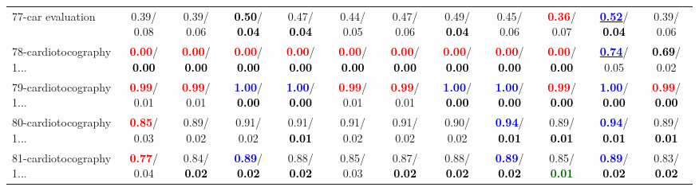 \begin{table}[h]
\begin{center}
{\begin{tabular}{lc|c|c|c|c|c|c|c|c|c|c}
77-car evaluation &   0.39/  0.08 &   0.39/  0.06 & \textcolor{black}{\textbf{  0.50}}/\textcolor{black}{\textbf{  0.04}} &   0.47/\textcolor{black}{\textbf{  0.04}} &   0.44/  0.05 &   0.47/  0.06 &   0.49/\textcolor{black}{\textbf{  0.04}} &   0.45/  0.06 & \textcolor{red}{\textbf{  0.36}}/  0.07 & \underline{\textcolor{blue}{\textbf{  0.52}}}/\textcolor{black}{\textbf{  0.04}} &   0.39/  0.06 \\
78-cardiotocography 1... & \textcolor{red}{\textbf{  0.00}}/\textcolor{black}{\textbf{  0.00}} & \textcolor{red}{\textbf{  0.00}}/\textcolor{black}{\textbf{  0.00}} & \textcolor{red}{\textbf{  0.00}}/\textcolor{black}{\textbf{  0.00}} & \textcolor{red}{\textbf{  0.00}}/\textcolor{black}{\textbf{  0.00}} & \textcolor{red}{\textbf{  0.00}}/\textcolor{black}{\textbf{  0.00}} & \textcolor{red}{\textbf{  0.00}}/\textcolor{black}{\textbf{  0.00}} & \textcolor{red}{\textbf{  0.00}}/\textcolor{black}{\textbf{  0.00}} & \textcolor{red}{\textbf{  0.00}}/\textcolor{black}{\textbf{  0.00}} & \textcolor{red}{\textbf{  0.00}}/\textcolor{black}{\textbf{  0.00}} & \underline{\textcolor{blue}{\textbf{  0.74}}}/  0.05 & \textcolor{black}{\textbf{  0.69}}/  0.02 \\ \hline
79-cardiotocography 1... & \textcolor{red}{\textbf{  0.99}}/  0.01 & \textcolor{red}{\textbf{  0.99}}/  0.01 & \textcolor{blue}{\textbf{  1.00}}/\textcolor{black}{\textbf{  0.00}} & \textcolor{blue}{\textbf{  1.00}}/\textcolor{black}{\textbf{  0.00}} & \textcolor{red}{\textbf{  0.99}}/  0.01 & \textcolor{red}{\textbf{  0.99}}/  0.01 & \textcolor{blue}{\textbf{  1.00}}/\textcolor{black}{\textbf{  0.00}} & \textcolor{blue}{\textbf{  1.00}}/\textcolor{black}{\textbf{  0.00}} & \textcolor{red}{\textbf{  0.99}}/\textcolor{black}{\textbf{  0.00}} & \textcolor{blue}{\textbf{  1.00}}/\textcolor{black}{\textbf{  0.00}} & \textcolor{red}{\textbf{  0.99}}/\textcolor{black}{\textbf{  0.00}} \\
80-cardiotocography 1... & \textcolor{red}{\textbf{  0.85}}/  0.03 &   0.89/  0.02 &   0.91/  0.02 &   0.91/\textcolor{black}{\textbf{  0.01}} &   0.91/  0.02 &   0.91/  0.02 &   0.90/  0.02 & \textcolor{blue}{\textbf{  0.94}}/\textcolor{black}{\textbf{  0.01}} &   0.89/\textcolor{black}{\textbf{  0.01}} & \textcolor{blue}{\textbf{  0.94}}/\textcolor{black}{\textbf{  0.01}} &   0.89/\textcolor{black}{\textbf{  0.01}} \\
81-cardiotocography 1... & \textcolor{red}{\textbf{  0.77}}/  0.04 &   0.84/\textcolor{black}{\textbf{  0.02}} & \textcolor{blue}{\textbf{  0.89}}/\textcolor{black}{\textbf{  0.02}} &   0.88/\textcolor{black}{\textbf{  0.02}} &   0.85/  0.03 &   0.87/\textcolor{black}{\textbf{  0.02}} &   0.88/\textcolor{black}{\textbf{  0.02}} & \textcolor{blue}{\textbf{  0.89}}/\textcolor{black}{\textbf{  0.02}} &   0.85/\textcolor{darkgreen}{\textbf{  0.01}} & \textcolor{blue}{\textbf{  0.89}}/\textcolor{black}{\textbf{  0.02}} &   0.83/\textcolor{black}{\textbf{  0.02}} \\

\end{tabular}}
\end{center}
\end{table}
